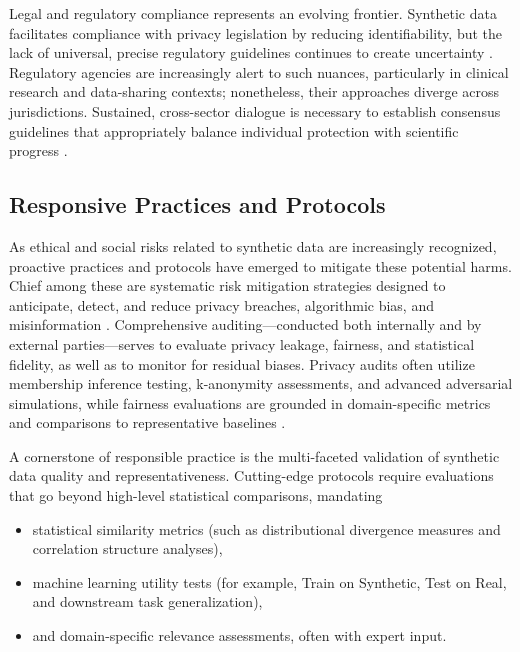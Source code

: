 \documentclass[sigconf]{acmart}
\begin{document}
Legal and regulatory compliance represents an evolving frontier. Synthetic data facilitates compliance with privacy legislation by reducing identifiability, but the lack of universal, precise regulatory guidelines continues to create uncertainty \cite{ref2}\cite{ref7}\cite{ref10}\cite{ref13}. Regulatory agencies are increasingly alert to such nuances, particularly in clinical research and data-sharing contexts; nonetheless, their approaches diverge across jurisdictions. Sustained, cross-sector dialogue is necessary to establish consensus guidelines that appropriately balance individual protection with scientific progress \cite{ref3}\cite{ref7}\cite{ref14}\cite{ref17}\cite{ref21}\cite{ref88}.

\subsection{Responsive Practices and Protocols}

As ethical and social risks related to synthetic data are increasingly recognized, proactive practices and protocols have emerged to mitigate these potential harms. Chief among these are systematic risk mitigation strategies designed to anticipate, detect, and reduce privacy breaches, algorithmic bias, and misinformation \cite{ref81}\cite{ref82}\cite{ref88}. Comprehensive auditing—conducted both internally and by external parties—serves to evaluate privacy leakage, fairness, and statistical fidelity, as well as to monitor for residual biases. Privacy audits often utilize membership inference testing, k-anonymity assessments, and advanced adversarial simulations, while fairness evaluations are grounded in domain-specific metrics and comparisons to representative baselines \cite{ref12}\cite{ref81}\cite{ref82}.

A cornerstone of responsible practice is the multi-faceted validation of synthetic data quality and representativeness. Cutting-edge protocols require evaluations that go beyond high-level statistical comparisons, mandating

\begin{itemize}
    \item statistical similarity metrics (such as distributional divergence measures and correlation structure analyses),
    \item machine learning utility tests (for example, Train on Synthetic, Test on Real, and downstream task generalization),
    \item and domain-specific relevance assessments, often with expert input.
\end{itemize}
\end{document}
